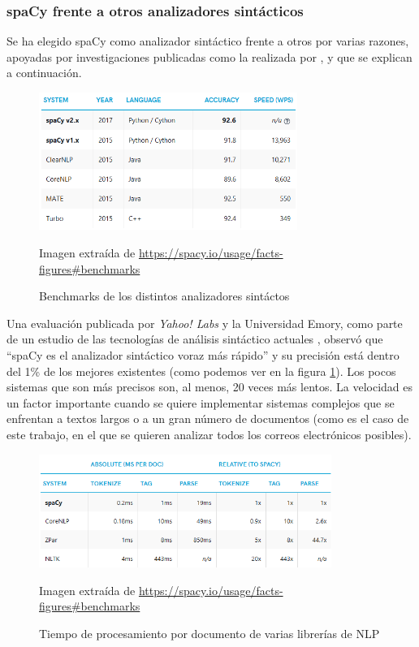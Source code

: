 \subsubsection{spaCy frente a otros analizadores sintácticos}\label{ssect:spacywhy}

Se ha elegido spaCy como analizador sintáctico frente a otros por varias razones, apoyadas por investigaciones publicadas como la realizada por \cite{choi2015depends}, y que se explican a continuación.

\begin{figure}[h]
	\centering%
	\includegraphics[width = 0.75\textwidth]{Imagenes/Bitmap/spacyeval.png}%
	\caption{Benchmarks de los distintos analizadores sintáctos}%
	Imagen extraída de \url{https://spacy.io/usage/facts-figures#benchmarks}
	\label{fig:spacyeval}
\end{figure}

Una evaluación publicada por \textit{Yahoo! Labs} y la Universidad Emory, como parte de un estudio de las tecnologías de análisis sintáctico actuales \citep{choi2015depends}, observó que ``spaCy es el analizador sintáctico voraz más rápido'' y su precisión está dentro del 1\% de los mejores existentes (como podemos ver en la figura \ref{fig:spacyeval}). Los pocos sistemas que son más precisos son, al menos, 20 veces más lentos. La velocidad es un factor importante cuando se quiere implementar sistemas complejos que se enfrentan a textos largos o a un gran número de documentos (como es el caso de este trabajo, en el que se quieren analizar todos los correos electrónicos posibles).

\begin{figure}[h]
	\centering%
	\includegraphics[width = 0.85\textwidth]{Imagenes/Bitmap/spacyspeed.png}%
	\caption{Tiempo de procesamiento por documento de varias librerías de NLP}%
	Imagen extraída de \url{https://spacy.io/usage/facts-figures#benchmarks}
	\label{fig:spacyspeed}
\end{figure}

